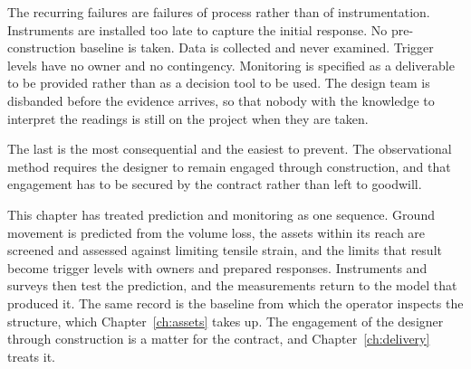 The recurring failures are failures of
process rather than of instrumentation. Instruments are installed too late to
capture the initial response. No pre-construction baseline is taken. Data is
collected and never examined. Trigger levels have no owner and no contingency.
Monitoring is specified as a deliverable to be provided rather than as a
decision tool to be used. The design team is disbanded before the evidence
arrives, so that nobody with the knowledge to interpret the readings is still
on the project when they are taken.

The last is the most consequential and the easiest to prevent. The
observational method requires the designer to remain engaged through
construction, and that engagement has to be secured by the contract rather
than left to goodwill.

This chapter has treated prediction and monitoring as one sequence. Ground
movement is predicted from the volume loss, the assets within its reach are
screened and assessed against limiting tensile strain, and the limits that
result become trigger levels with owners and prepared responses. Instruments
and surveys then test the prediction, and the measurements return to the model
that produced it. The same record is the baseline from which the operator
inspects the structure, which Chapter~\ref{ch:assets} takes up. The engagement
of the designer through construction is a matter for the contract, and
Chapter~\ref{ch:delivery} treats it.

\chapterreferences
